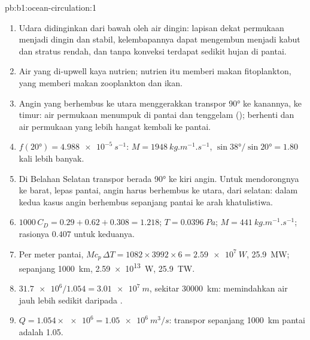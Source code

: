 \begin{solution}{pb:b1:ocean-circulation:1}
\begin{enumerate}
  \item Udara didinginkan dari bawah oleh air dingin: lapisan dekat permukaan menjadi
        dingin dan stabil, kelembapannya dapat mengembun menjadi kabut dan stratus rendah,
        dan tanpa konveksi terdapat sedikit hujan di pantai.
  \item Air yang di-upwell kaya nutrien; nutrien itu memberi makan fitoplankton, yang memberi makan zooplankton dan ikan.
  \item Angin yang berhembus ke utara menggerakkan transpor \ang{90} ke kanannya, ke timur: air permukaan menumpuk di pantai dan tenggelam ();  berhenti dan air permukaan yang lebih hangat kembali ke pantai.
  \item $f(\ang{20}) = \qty{4.988e-5}{s^{-1}}$: $M = \qty{1948}{kg.m^{-1}.s^{-1}}$,
        $\sin\ang{38}/\sin\ang{20} = 1.80$ kali lebih banyak.
  \item Di Belahan Selatan transpor berada \ang{90} ke kiri angin. Untuk mendorongnya ke barat, lepas pantai, angin harus berhembus ke utara, dari selatan: dalam kedua kasus angin berhembus sepanjang pantai ke arah khatulistiwa.
  \item $1000\,C_D = 0.29 + 0.62 + 0.308 = 1.218$; $T = \qty{0.0396}{Pa}$; $M =
        \qty{441}{kg.m^{-1}.s^{-1}}$; rasionya $0.407$ untuk keduanya.
  \item Per meter pantai, $M c_p\,\Delta T = 1082 \times 3992 \times 6 =
        \qty{2.59e7}{W}$, \qty{25.9}{MW}; sepanjang \qty{1000}{km}, \qty{2.59e13}{W},
        \qty{25.9}{TW}.
  \item $\num{31.7e6}/1.054 = \qty{3.01e7}{m}$, sekitar \qty{30000}{km}:  memindahkan air jauh lebih sedikit daripada .
  \item $Q = 1.054 \times \num{e6} = \qty{1.05e6}{m^3/s}$: transpor  sepanjang \qty{1000}{km} pantai adalah \qty{1.05}{\sverdrup}.
\end{enumerate}
\end{solution}

